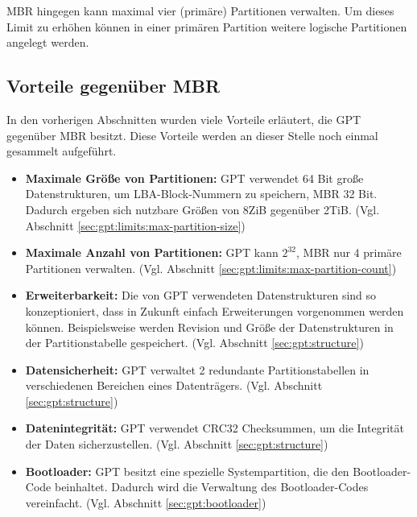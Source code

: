 MBR hingegen kann maximal vier (primäre) Partitionen verwalten.
Um dieses Limit zu erhöhen können in einer primären Partition weitere logische Partitionen angelegt werden.

\subsection{Vorteile gegenüber MBR}
\label{sec:gpt:advantages}

In den vorherigen Abschnitten wurden viele Vorteile erläutert, die GPT gegenüber MBR besitzt.
Diese Vorteile werden an dieser Stelle noch einmal gesammelt aufgeführt.

\begin{itemize}
    \item \textbf{Maximale Größe von Partitionen:}
    GPT verwendet 64 Bit große Datenstrukturen, um LBA-Block-Nummern zu speichern, MBR 32 Bit.
    Dadurch ergeben sich nutzbare Größen von 8ZiB gegenüber 2TiB. 
    (Vgl. Abschnitt \ref{sec:gpt:limits:max-partition-size})

    \item \textbf{Maximale Anzahl von Partitionen:}
    GPT kann $ 2^{32} $, MBR nur 4 primäre Partitionen verwalten. 
    (Vgl. Abschnitt \ref{sec:gpt:limits:max-partition-count})

    \item \textbf{Erweiterbarkeit:}
    Die von GPT verwendeten Datenstrukturen sind so konzeptioniert, dass in Zukunft einfach Erweiterungen vorgenommen werden können.
    Beispielsweise werden Revision und Größe der Datenstrukturen in der Partitionstabelle gespeichert. (Vgl. Abschnitt \ref{sec:gpt:structure})

    \item \textbf{Datensicherheit:} 
    GPT verwaltet 2 redundante Partitionstabellen in verschiedenen Bereichen eines Datenträgers.
    (Vgl. Abschnitt \ref{sec:gpt:structure})
    
    \item \textbf{Datenintegrität:}
    GPT verwendet CRC32 Checksummen, um die Integrität der Daten sicherzustellen.
    (Vgl. Abschnitt \ref{sec:gpt:structure})

    \item \textbf{Bootloader:} 
    GPT besitzt eine spezielle Systempartition, die den Bootloader-Code beinhaltet.
    Dadurch wird die Verwaltung des Bootloader-Codes vereinfacht.
    (Vgl. Abschnitt \ref{sec:gpt:bootloader})

\end{itemize}
